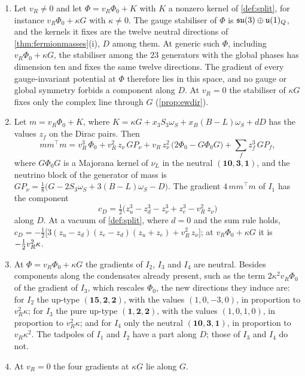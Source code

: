 \begin{theorem}
\label{thm:potential}
\begin{enumerate}[label=(\roman*),leftmargin=2.2em,itemsep=1pt]
\item Let $v_R\ne0$ and let $\Phi=v_R\Phi_0+K$ with $K$ a nonzero kernel of \cref{def:split}, for instance $v_R\Phi_0+\kappa G$ with
$\kappa\ne0$. The gauge stabiliser of $\Phi$ is $\mathfrak{su}(3)\oplus\mathfrak{u}(1)_Q$, and the kernels it fixes are the twelve neutral directions of
\cref{thm:fermionmasses}(i), $D$ among them. At generic such $\Phi$, including $v_R\Phi_0+\kappa G$, the stabiliser among the $23$ generators
with the global phases has dimension ten and fixes the same twelve directions. The gradient of every gauge-invariant potential at $\Phi$
therefore lies in this space, and no gauge or global symmetry forbids a component along $D$. At $v_R=0$ the stabiliser of $\kappa G$ fixes
only the complex line through $G$ (\cref{prop:ewdir}).
\item Let $m=v_R\Phi_0+K$, where $K=\kappa G+x_3S_3\omega_S+x_B(B\!-\!L)\omega_S+dD$ has the values $z_f$ on the Dirac pairs. Then
\begin{equation}
\label{eq:gradI1}
mm^\top m=v_R^3\,\Phi_0+v_R^2\,z_\nu\,GP_\nu+v_R\,z_\nu^2\,\bigl(2\Phi_0-G\Phi_0G\bigr)+\sum_fz_f^3\,GP_f ,
\end{equation}
where $G\Phi_0G$ is a Majorana kernel of $\nu_L$ in the neutral $(\mathbf{10},\mathbf3,\mathbf1)$, and the neutrino block of the generator of
mass is $GP_\nu=\tfrac18\bigl(G-2S_3\omega_S+3(B\!-\!L)\omega_S-D\bigr)$. The gradient $4\,mm^\top m$ of $I_1$ has the component
\begin{equation}
\label{eq:Dcoef}
c_D=\tfrac12\bigl(z_u^3-z_d^3-z_\nu^3+z_e^3-v_R^2\,z_\nu\bigr)
\end{equation}
along $D$. At a vacuum of \cref{def:split}, where $d=0$ and the sum rule holds,
$c_D=-\tfrac12\bigl[3(z_u-z_d)(z_e-z_d)(z_u+z_e)+v_R^2\,z_\nu\bigr]$; at $v_R\Phi_0+\kappa G$ it is $-\tfrac12 v_R^2\kappa$.
\item At $\Phi=v_R\Phi_0+\kappa G$ the gradients of $I_2$, $I_3$ and $I_4$ are neutral. Besides components along the condensates already
present, such as the term $2\kappa^2v_R\Phi_0$ of the gradient of $I_3$, which rescales $\Phi_0$, the new directions they induce are: for
$I_2$ the up-type $(\mathbf{15},\mathbf2,\mathbf2)$, with the values $(1,0,-3,0)$, in proportion to $v_R^2\kappa$; for $I_3$ the pure up-type
$(\mathbf1,\mathbf2,\mathbf2)$, with the values $(1,0,1,0)$, in proportion to $v_R^2\kappa$; and for $I_4$ only the neutral
$(\mathbf{10},\mathbf3,\mathbf1)$, in proportion to $v_R\kappa^2$. The tadpoles of $I_1$ and $I_2$ have a part along $D$; those of $I_3$ and
$I_4$ do not.
\item At $v_R=0$ the four gradients at $\kappa G$ lie along $G$.
\end{enumerate}
\end{theorem}

